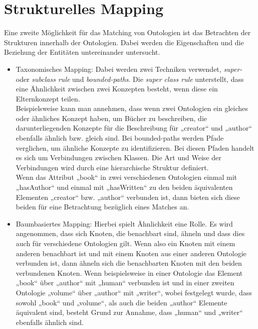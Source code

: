 	\section{Strukturelles Mapping}
	\label{StrukturellesMapping}
	Eine zweite Möglichkeit für das Matching von Ontologien ist das Betrachten der
	Strukturen innerhalb der Ontologien. Dabei werden die Eigenschaften und die
	Beziehung der Entitäten untereinander untersucht.
	\begin{itemize}
		\item Taxonomisches Mapping: Dabei werden zwei Techniken
		verwendet, \textit{super-} oder  \textit{subclass rule} und
		\textit{bounded-paths}. Die \textit{super class rule} unterstellt, dass eine
		Ähnlichkeit zwischen zwei Konzepten besteht, wenn diese ein Elternkonzept
		teilen. \cite{EuzShv07}\\
		Beispielsweise kann man annehmen, dass wenn zwei
		Ontologien ein gleiches oder ähnliches Konzept haben, um Bücher zu
		beschreiben, die darunterliegenden Konzepte für die Beschreibung für
		„creator“ und „author“ ebenfalls ähnlich bzw. gleich sind. Bei bounded-paths
		werden Pfade verglichen, um ähnliche Konzepte zu identifizieren. Bei diesen
		Pfaden handelt es sich um Verbindungen zwischen Klassen. Die Art und Weise der
		Verbindungen wird durch eine hierarchische Struktur definiert.\cite{EuzShv07}\\
		Wenn das Attribut „book“ in zwei verschiedenen Ontologien
		einmal mit „hasAuthor“ und einmal mit „hasWritten“ zu den beiden äquivalenten
		Elementen „creator“ bzw. „author“ verbunden ist, dann bieten sich diese beiden
		für eine Betrachtung bezüglich eines Matches an.
		\item Baumbasiertes Mapping: Hierbei spielt Ähnlichkeit eine
		Rolle.
		Es wird angenommen, dass sich Knoten, die benachbart sind, ähneln und dass
		dies auch für verschiedene Ontologien gilt. Wenn also ein Knoten mit einem
		anderen benachbart ist und mit einem Knoten aus einer anderen Ontologie verbunden ist,
		dann ähneln sich die benachbarten Knoten mit den beiden verbundenen Knoten.
		Wenn beispielsweise in einer Ontologie das Element „book“ über „author“ mit „human“
		verbunden ist und in einer zweiten Ontologie „volume“ über „author“ mit
		„writer“, wobei festgelegt wurde, dass sowohl „book“ und „volume“, als auch
		die beiden „author“ Elemente äquivalent sind, besteht Grund zur Annahme, dass
		„human“ und „writer“ ebenfalls ähnlich sind.\cite{EuzShv07}
	\end{itemize}
	
